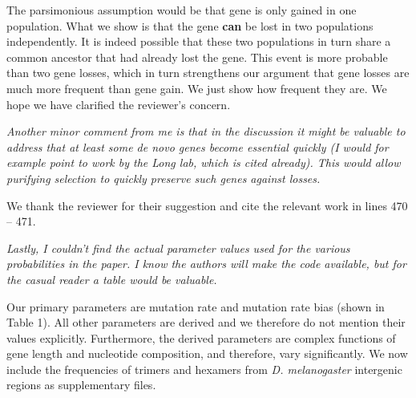 \documentclass[12pt,a4paper]{article}
\begin{document}
The parsimonious assumption would be that gene is only gained in one population. What we show is that the gene \textbf{can} be lost in two populations independently. It is indeed possible that these two populations in turn share a common ancestor that had already lost the gene. This event is more probable than two gene losses, which in turn strengthens our argument that gene losses are much more frequent than gene gain. We just show how frequent they are. We hope we have clarified the reviewer's concern.

{\itshape Another minor comment from me is that in the discussion it might be valuable to address that at least some de novo genes become essential quickly (I would for example point to work by the Long lab, which is cited already). This would allow purifying selection to quickly preserve such genes against losses.}

We thank the reviewer for their suggestion and cite the relevant work in lines 470 -- 471.

{\itshape Lastly, I couldn't find the actual parameter values used for the various probabilities in the paper. I know the authors will make the code available, but for the casual reader a table would be valuable.}

Our primary parameters are mutation rate and mutation rate bias (shown in Table 1). All other parameters are derived and we therefore do not mention their values explicitly. Furthermore, the derived parameters are complex functions of gene length and nucleotide composition, and therefore, vary significantly. We now include the frequencies of trimers and hexamers from \textit{D. melanogaster} intergenic regions as supplementary files. 
\end{document}
